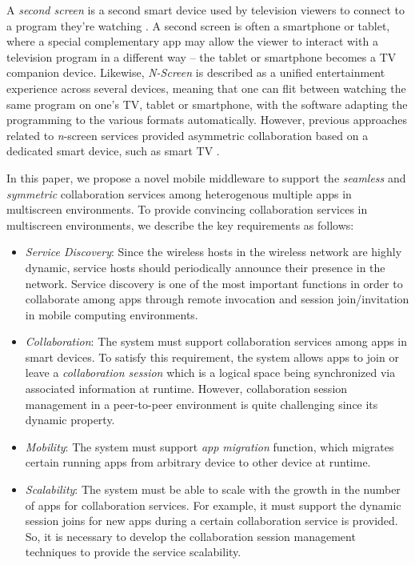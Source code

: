 \documentclass[conference]{IEEEtran}
\newcommand{\bi}{\begin{itemize}}
\newcommand{\ei}{\end{itemize}}
\newcommand{\ii}{\item}
\begin{document}
A \textit{second screen} is a second smart device used by television viewers to connect to a program they're watching \cite{Nandakumar:2014}. 
A second screen is often a smartphone or tablet, where a special complementary app may allow the viewer to interact with a television program in a different way -- the tablet or smartphone becomes a TV companion device. 
Likewise, \textit{N-Screen} is described as a unified entertainment experience across several devices, meaning that one can flit between watching the same program on one's TV, tablet or smartphone, with the software adapting the programming to the various formats automatically. However, previous approaches related to \textit{n}-screen services provided asymmetric collaboration based on a dedicated smart device, such as smart TV \cite{samsung:2014}. 

In this paper, we propose a novel mobile middleware to support the \textit{seamless} and \textit{symmetric} collaboration services among heterogenous multiple apps in multiscreen environments.
To provide convincing collaboration services in multiscreen environments, we describe the key requirements as follows:
\bi
\ii \emph{Service Discovery}: 
Since the wireless hosts in the wireless network are highly dynamic,  service hosts should periodically announce their presence in the network.
Service discovery is one of the most important functions in order to collaborate among apps through remote invocation and session join/invitation in mobile computing environments.
\ii \emph{Collaboration}: 
The system must support  collaboration services among apps in smart devices. To satisfy this requirement, the system allows apps to join or leave a \textit{collaboration session} which is a logical space being synchronized via associated information at runtime.
However, collaboration session management in a peer-to-peer environment is quite challenging since its dynamic property. 
 \ii \emph{Mobility}: 
The system must support \textit{app migration} function, which migrates certain running apps from arbitrary device to other device at runtime.
\ii \emph{Scalability}: 
The system must be able to scale with the growth in the number of apps for collaboration services. For example, it must support the dynamic session joins for new apps during a certain collaboration service is provided. So, it is necessary to develop the collaboration session management techniques to provide the service scalability.
\ei

\end{document}
